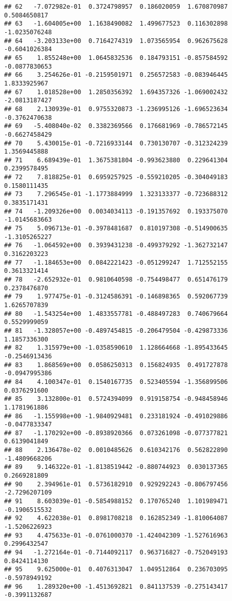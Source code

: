 \documentclass[
]{article}
\begin{document}
\begin{verbatim}
## 62   -7.072982e-01  0.3724798957  0.186020059  1.670870987  0.5084650817
## 63   -1.604005e+00  1.1638490082  1.499677523  0.116302898 -1.0235076248
## 64   -3.203133e+00  0.7164274319  1.073565954  0.962675628 -0.6041026384
## 65    1.855248e+00  1.0645832536  0.184793151 -0.857584592 -0.0877830653
## 66    3.254626e-01 -0.2159501971  0.256572583 -0.083946445  1.8333925967
## 67    1.018528e+00  1.2850356392  1.694357326 -1.069002432 -2.0813187427
## 68    2.130939e-01  0.9755320873 -1.236995126 -1.696523634 -0.3762470638
## 69   -5.408040e-02  0.3382369566  0.176681969 -0.786572145 -0.6627458429
## 70    5.430015e-01 -0.7216933144  0.730130707 -0.312324239  1.3569445888
## 71    6.689439e-01  1.3675381804 -0.993623880  0.229641304  0.2399578495
## 72    7.818825e-01  0.6959257925 -0.559210205 -0.304049183  0.1580111435
## 73    7.296545e-01 -1.1773884999  1.323133377 -0.723688312  0.3835171431
## 74   -1.209326e+00  0.0034034113 -0.191357692  0.193375070 -1.0145683663
## 75    5.096713e-01 -0.3978481687  0.810197308 -0.514900635 -1.3105265227
## 76   -1.064592e+00  0.3939431238 -0.499379292 -1.362732147  0.3162203223
## 77   -1.184653e+00  0.0842221423 -0.051299247  1.712552155  0.3613321414
## 78   -2.652932e-01  0.9810640598 -0.754498477  0.651476179  0.2378476870
## 79    1.977475e-01 -0.3124586391 -0.146898365  0.592067739  1.6265707839
## 80   -1.543254e+00  1.4833557781 -0.488497283  0.740679664  0.5529999059
## 81   -1.328057e+00 -0.4897454815 -0.206479504 -0.429873336  1.1857336300
## 82    1.315979e+00 -1.0358590610  1.128664668 -1.895433645 -0.2546913436
## 83    1.868569e+00  0.0586250313  0.156824935  0.491727878 -0.0947995386
## 84    4.100347e-01  0.1540167735  0.523405594 -1.356899506  0.0376291600
## 85    3.132800e-01  0.5724394099  0.919158754 -0.948458946  1.1781961886
## 86   -1.155998e+00 -1.9840929481  0.233181924 -0.491029886 -0.0477833347
## 87   -1.170292e+00 -0.8938920366  0.073261098 -0.077377821  0.6139041849
## 88    2.136478e-02  0.0010485626  0.610342176  0.562822890 -1.4809668206
## 89    9.146322e-01 -1.8138519442 -0.880744923  0.030137365  0.2669281809
## 90    2.394961e-01  0.5736182910  0.929292243 -0.806797456 -2.7296207109
## 91    8.603039e-01 -0.5854988152  0.170765240  1.101989471 -0.1906515532
## 92    4.622038e-01  0.8981708218  0.162852349 -1.810064087 -1.5206226923
## 93    4.475633e-01 -0.0761000370 -1.424042309 -1.527616963  0.2996432547
## 94   -1.272164e-01 -0.7144092117  0.963716827 -0.752049193  0.8424114130
## 95    9.625000e-01  0.4076313047  1.049512864  0.236703095 -0.5978949192
## 96    1.289320e+00 -1.4513692821  0.841137539 -0.275143417 -0.3991132687

\end{verbatim}
\end{document}

